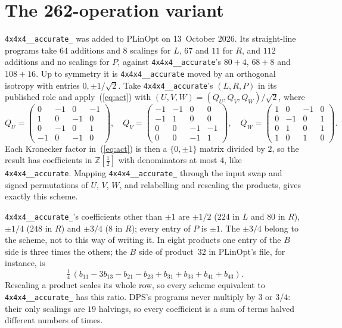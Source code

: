 \documentclass[11pt]{article}
\theoremstyle{remark}
\newcommand{\Z}{\mathbb{Z}}
\newcommand{\Zh}{\Z[\tfrac12]}
\newcommand{\acc}{\texttt{4x4x4\_\allowbreak 48\_\allowbreak accurate}\xspace}
\newcommand{\acct}{\texttt{4x4x4\_\allowbreak 48\_\allowbreak accurate\_\allowbreak 262}\xspace}
\begin{document}
\section{The 262-operation variant}\label{sec:scheme}

\acct was added to PLinOpt on 13~October 2026.  Its straight-line programs take $64$
additions and $8$ scalings for $L$, $67$ and $11$ for $R$, and $112$
additions and no scalings for $P$, against \acc's $80+4$, $68+8$ and
$108+16$.  Up to symmetry it is
\acc moved by an orthogonal isotropy with entries
$0,\pm1/\sqrt2$.  Take \acc's $(L,R,P)$ in its published role and
apply~(\ref{eq:act}) with $(U,V,W)=(Q_U,Q_V,Q_W)/\sqrt2$, where
\begin{equation}\label{eq:QUVW}
Q_U=\begin{pmatrix}0&-1&0&-1\\1&0&-1&0\\0&-1&0&1\\-1&0&-1&0\end{pmatrix},\quad
Q_V=\begin{pmatrix}-1&-1&0&0\\-1&1&0&0\\0&0&-1&-1\\0&0&-1&1\end{pmatrix},\quad
Q_W=\begin{pmatrix}1&0&-1&0\\0&-1&0&1\\0&1&0&1\\1&0&1&0\end{pmatrix}.
\end{equation}
Each Kronecker factor in~(\ref{eq:act}) is then a $\{0,\pm1\}$ matrix
divided by $2$, so the result has coefficients in $\Zh$ with
denominators at most $4$, like \acc.  Mapping
\acct through the input swap and signed
permutations of $U$, $V$, $W$, and relabelling and rescaling the
products, gives exactly this scheme.

\acct's coefficients other than $\pm1$ are $\pm1/2$ ($224$ in $L$ and
$80$ in $R$), $\pm1/4$ ($248$ in $R$) and $\pm3/4$ ($8$ in $R$); every
entry of $P$ is $\pm1$.  The $\pm3/4$ belong to the scheme, not to this
way of writing it.  In eight products one entry of the $B$ side is three
times the others; the $B$ side of product~$32$ in PLinOpt's file, for
instance, is
\begin{equation}\label{eq:b32}
\tfrac14\,(b_{11}-3b_{13}-b_{21}-b_{23}+b_{31}+b_{33}+b_{41}+b_{43}).
\end{equation}
Rescaling a product scales its whole row, so every scheme equivalent to
\acct has this ratio.  DPS's programs never multiply by $3$ or
$3/4$: their only scalings are $19$ halvings, so every coefficient is a
sum of terms halved different numbers of times.
\end{document}
